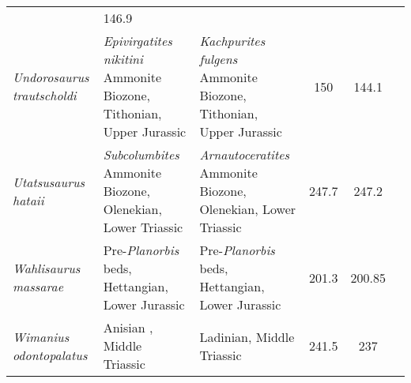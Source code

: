 \begin{longtabu}{>{\itshape}lXXSSl}
                                                                       & 146.9
                                                                       &
                                                                       \cite{Efimov1999PZa} \\                    
	Undorosaurus trautscholdi                            &
        \emph{Epivirgatites nikitini} Ammonite Biozone, Tithonian, Upper
        Jurassic                                                          &
        \emph{Kachpurites fulgens} Ammonite Biozone, Tithonian, Upper Jurassic
                                                                          & 150
                                                                          &
        144.1                    & \cite{Arkhangelsky2014PZIR} \\               
	Utatsusaurus hataii                                  &
        \emph{Subcolumbites} Ammonite Biozone, Olenekian, Lower Triassic
                                                             &
        \emph{Arnautoceratites} Ammonite Biozone, Olenekian, Lower Triassic
                                                             & 247.7
                                                             & 247.2
                                                             &
                                                             \cite{Shikama1978SRTUGa} \\                    
	Wahlisaurus massarae                                 &
        Pre-\emph{Planorbis} beds, Hettangian, Lower Jurassic
                                                             &
        Pre-\emph{Planorbis} beds, Hettangian, Lower Jurassic
                                                             & 201.3
                                                             & 200.85
                                                             &
                                                             \cite{Lomax2016JSP} \\                      
	Wimanius odontopalatus                               & Anisian , Middle
        Triassic
                                                             & Ladinian, Middle
        Triassic
                                                             & 241.5
                                                             & 237
                                                             &
                                                             \cite{Maisch1998NJFGPAd} \\                    

\end{longtabu}

